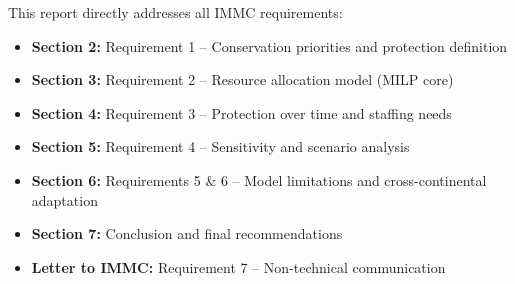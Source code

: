This report directly addresses all IMMC requirements:
\begin{itemize}
    \item \textbf{Section 2:} Requirement 1 -- Conservation priorities and protection definition
    \item \textbf{Section 3:} Requirement 2 -- Resource allocation model (MILP core)
    \item \textbf{Section 4:} Requirement 3 -- Protection over time and staffing needs
    \item \textbf{Section 5:} Requirement 4 -- Sensitivity and scenario analysis
    \item \textbf{Section 6:} Requirements 5 \& 6 -- Model limitations and cross-continental adaptation
    \item \textbf{Section 7:} Conclusion and final recommendations
    \item \textbf{Letter to IMMC:} Requirement 7 -- Non-technical communication
\end{itemize}
